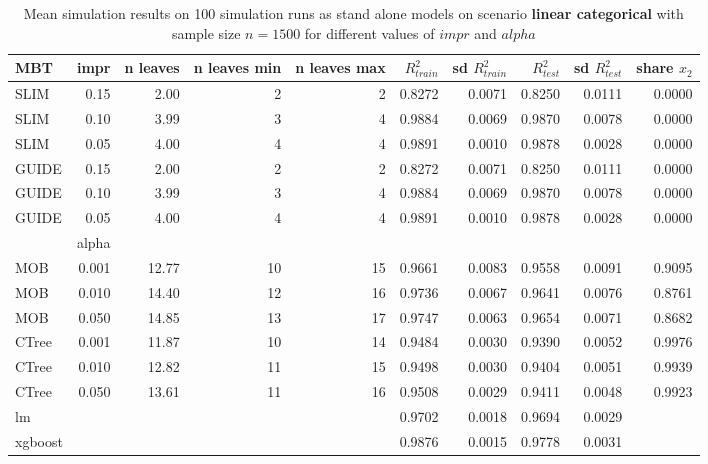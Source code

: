\begin{table}[!htb]

\caption{Mean simulation results on 100 simulation runs as stand alone models on scenario \textbf{linear categorical} with sample size $n = 1500$ for different values of $impr$ and $alpha$}
\centering \tiny
\begin{tabular}[t]{l|r|r|r|r|r|r|r|r|r}
\hline
MBT & impr  & n leaves & n leaves min & n leaves max & $R^2_{train}$ & sd $R^2_{train}$ & $R^2_{test}$ & sd $R^2_{test}$ & share $x_2$\\
\hline

\hline
SLIM & 0.15 & 2.00 & 2 & 2 & 0.8272 & 0.0071 & 0.8250 & 0.0111 & 0.0000\\
SLIM & 0.10 & 3.99 & 3 & 4 & 0.9884 & 0.0069 & 0.9870 & 0.0078 & 0.0000\\
SLIM & 0.05 & 4.00 & 4 & 4 & 0.9891 & 0.0010 & 0.9878 & 0.0028 & 0.0000\\
GUIDE & 0.15 & 2.00 & 2 & 2 & 0.8272 & 0.0071 & 0.8250 & 0.0111 & 0.0000\\
GUIDE & 0.10 & 3.99 & 3 & 4 & 0.9884 & 0.0069 & 0.9870 & 0.0078 & 0.0000\\
GUIDE & 0.05 & 4.00 & 4 & 4 & 0.9891 & 0.0010 & 0.9878 & 0.0028 & 0.0000\\
\hline

  & alpha & & & & & & & & \\
\hline
MOB & 0.001 & 12.77 & 10 & 15 & 0.9661 & 0.0083 & 0.9558 & 0.0091 & 0.9095\\
MOB & 0.010 & 14.40 & 12 & 16 & 0.9736 & 0.0067 & 0.9641 & 0.0076 & 0.8761\\
MOB & 0.050 & 14.85 & 13 & 17 & 0.9747 & 0.0063 & 0.9654 & 0.0071 & 0.8682\\
CTree & 0.001 & 11.87 & 10 & 14 & 0.9484 & 0.0030 & 0.9390 & 0.0052 & 0.9976\\
CTree & 0.010 & 12.82 & 11 & 15 & 0.9498 & 0.0030 & 0.9404 & 0.0051 & 0.9939\\
CTree & 0.050 & 13.61 & 11 & 16 & 0.9508 & 0.0029 & 0.9411 & 0.0048 & 0.9923\\
\hline
lm & & & & & 0.9702 & 0.0018 & 0.9694 & 0.0029 &\\
xgboost & & & & & 0.9876 & 0.0015 & 0.9778 & 0.0031 & \\
\hline

\end{tabular}
\label{tab:linear_abrupt_summary} 
\end{table}



